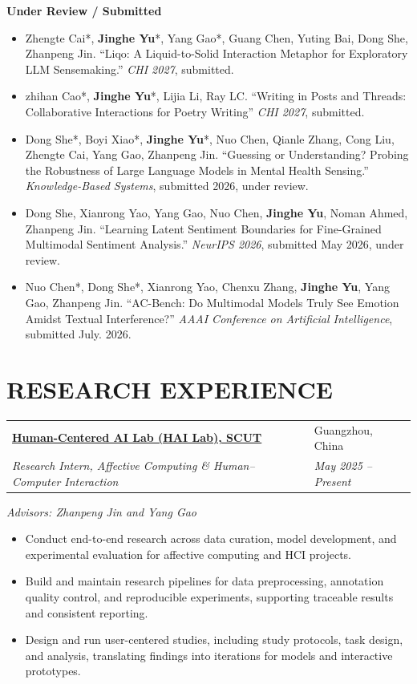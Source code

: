 \documentclass[a4paper,10pt]{extarticle}
\makeatletter
\newcommand{\roleentry}[4]{%
    \begin{tabularx}{\textwidth}{@{}>{\raggedright\arraybackslash}X>{\raggedleft\arraybackslash}p{1.35in}@{}}
        \textbf{#1} & #2\\
        \textit{#3} & \textit{#4}
    \end{tabularx}
}
\makeatother
\begin{document}
\textbf{Under Review / Submitted}
\begin{itemize}
    \item Zhengte Cai*, \textbf{Jinghe Yu}*, Yang Gao*, Guang Chen, Yuting Bai, Dong She, Zhanpeng Jin. ``Liqo: A Liquid-to-Solid Interaction Metaphor for Exploratory LLM Sensemaking.'' \textit{CHI 2027}, submitted.
    \item zhihan Cao*, \textbf{Jinghe Yu}*, Lijia Li, Ray LC. ``Writing in Posts and Threads: Collaborative Interactions for Poetry Writing'' \textit{CHI 2027}, submitted.
    \item Dong She*, Boyi Xiao*, \textbf{Jinghe Yu}*, Nuo Chen, Qianle Zhang, Cong Liu, Zhengte Cai, Yang Gao, Zhanpeng Jin. ``Guessing or Understanding? Probing the Robustness of Large Language Models in Mental Health Sensing.'' \textit{Knowledge-Based Systems}, submitted 2026, under review.
    \item Dong She, Xianrong Yao, Yang Gao, Nuo Chen, \textbf{Jinghe Yu}, Noman Ahmed, Zhanpeng Jin. ``Learning Latent Sentiment Boundaries for Fine-Grained Multimodal Sentiment Analysis.'' \textit{NeurIPS 2026}, submitted May 2026, under review.
    \item Nuo Chen*, Dong She*, Xianrong Yao, Chenxu Zhang, \textbf{Jinghe Yu}, Yang Gao, Zhanpeng Jin. ``AC-Bench: Do Multimodal Models Truly See Emotion Amidst Textual Interference?'' \textit{AAAI Conference on Artificial Intelligence}, submitted July. 2026.
\end{itemize}

\section*{RESEARCH EXPERIENCE}
\roleentry{\href{https://scuthcc.top/}{Human-Centered AI Lab (HAI Lab), SCUT}}{Guangzhou, China}{Research Intern, Affective Computing \& Human--Computer Interaction}{May 2025 -- Present}
\textit{Advisors: Zhanpeng Jin and Yang Gao}
\begin{itemize}
    \item Conduct end-to-end research across data curation, model development, and experimental evaluation for affective computing and HCI projects.
    \item Build and maintain research pipelines for data preprocessing, annotation quality control, and reproducible experiments, supporting traceable results and consistent reporting.
    \item Design and run user-centered studies, including study protocols, task design, and analysis, translating findings into iterations for models and interactive prototypes.
\end{itemize}
\end{document}
